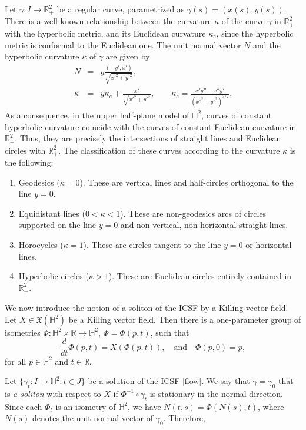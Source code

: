\documentclass[12pt]{amsart}
\theoremstyle{plain}
\theoremstyle{definition}
\def\h{\mathbb H}
\def\r{\mathbb R}
\begin{document}
Let $\gamma\colon I\to\r^2_+$ be a regular curve, parametrized as $\gamma(s)=(x(s),y(s))$. There is a well-known relationship between 
the curvature $\kappa$ of the curve $\gamma$ in $\r^2_+$ with the hyperbolic metric, and its Euclidean curvature $\kappa_e$, since the hyperbolic metric is conformal to the Euclidean one. The unit normal vector $N$ and the hyperbolic curvature $\kappa$ of $\gamma$ are given by 
\begin{eqnarray}
N&=&y\frac{(-y',x')}{\sqrt{x'^2+y'^2}},\label{ke1}\\
\kappa&=&y\kappa_e+\frac{x'}{\sqrt{x'^2+y'^2}},\qquad \kappa_e=\frac{x'y''-x''y'}{(x'^2+y'^2)^{3/2}}.\label{ke2}
\end{eqnarray} 
As a consequence, in the upper half-plane model of $\h^2$, curves of constant hyperbolic curvature coincide with the curves of constant Euclidean curvature in $\r^2_+$.  Thus, they are precisely the intersections of straight lines and Euclidean circles with $\r^2_{+}$. The classification of these curves according to the curvature $\kappa$ is the following:  
\begin{enumerate}
\item Geodesics ($\kappa=0$). These are vertical lines and half-circles orthogonal to the line $y=0$.  
\item Equidistant lines ($0<\kappa<1$). These are non-geodesics arcs of circles supported on the line $y=0$ and non-vertical, non-horizontal straight lines.  
\item Horocycles ($\kappa=1$). These are circles tangent to the line $y=0$ or horizontal lines.   
\item Hyperbolic circles  ($\kappa>1$). These are Euclidean circles entirely contained in $\r^2_+$.  
\end{enumerate}

We now introduce the notion of a soliton of the ICSF by a Killing vector field. Let $X\in\mathfrak{X}(\h^2)$ be a Killing vector field. Then there is a one-parameter group of isometries $\Phi\colon\h^2\times\r\to\h^2$, $\Phi=\Phi(p,t)$,  such that 
\begin{equation}\label{ft}
\frac{d}{dt}\Phi(p,t)=X(\Phi(p,t)),\quad \mbox{and}\quad \Phi(p, 0)=p,
\end{equation}
for all $p\in\h^2$ and $t\in\r$.

Let $\{\gamma_t\colon I\to\h^2\colon t\in J\}$ be  a solution of the ICSF \eqref{flow}. We say that $\gamma=\gamma_0$ that is \textit{a soliton} with respect to   $X$ if $\Phi^{-1}\circ\gamma_t$ is stationary in the normal direction. Since each $\Phi_t$ is an isometry of $\h^2$, we have $N(t,s)=\Phi(N(s),t)$, where $N(s)$ denotes the unit normal vector of $\gamma_0$. Therefore,
\end{document}
